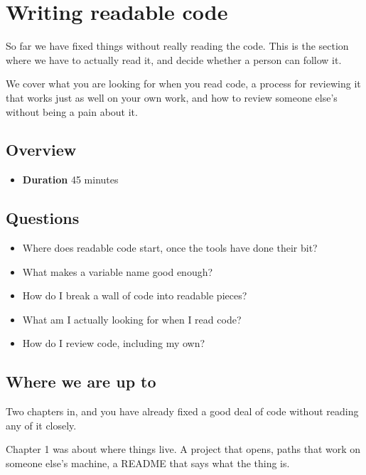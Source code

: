 \documentclass[
  letterpaper,
  justified,
  a4paper]{tufte-book}
\providecommand{\tightlist}{%
  \setlength{\itemsep}{0pt}\setlength{\parskip}{0pt}}
\providecommand{\tightlist}{%
  \setlength{\itemsep}{0pt}\setlength{\parskip}{0pt}}
\begin{document}
\chapter{Writing readable code}\label{writing-readable-code-1}

So far we have fixed things without really reading the code. This is the
section where we have to actually read it, and decide whether a person
can follow it.

We cover what you are looking for when you read code, a process for
reviewing it that works just as well on your own work, and how to review
someone else's without being a pain about it.

\section{Overview}\label{overview-2}

\begin{itemize}
\tightlist
\item
  \textbf{Duration} 45 minutes
\end{itemize}

\section{Questions}\label{questions-1}

\begin{itemize}
\tightlist
\item
  Where does readable code start, once the tools have done their bit?
\item
  What makes a variable name good enough?
\item
  How do I break a wall of code into readable pieces?
\item
  What am I actually looking for when I read code?
\item
  How do I review code, including my own?
\end{itemize}

\section{Where we are up to}\label{where-we-are-up-to}

Two chapters in, and you have already fixed a good deal of code without
reading any of it closely.

Chapter 1 was about where things live. A project that opens, paths that
work on someone else's machine, a README that says what the thing is.
\end{document}
